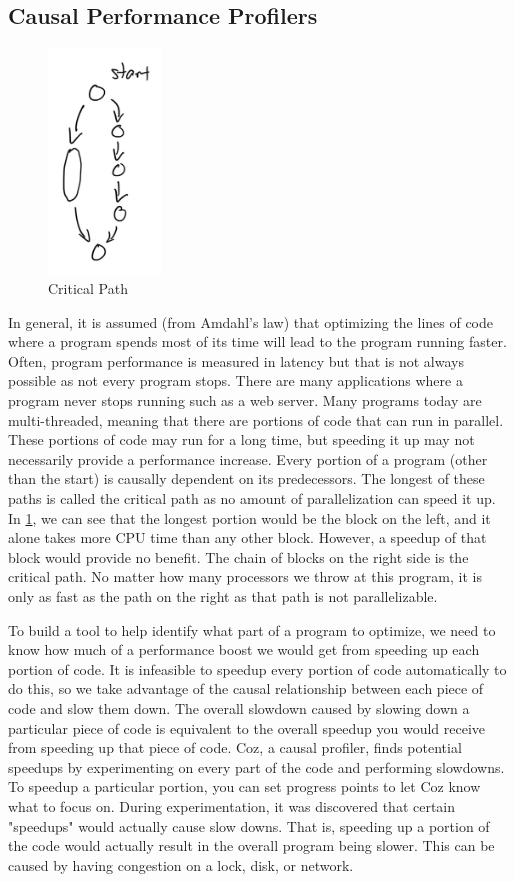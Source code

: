 \documentclass[10pt]{article}
\begin{document}
\subsection{Causal Performance Profilers}
\begin{figure}[H]
\centering
\includegraphics[width=3cm]{critical_path.jpeg}
\caption{Critical Path}
\label{fig:1}
\end{figure}
In general, it is assumed (from Amdahl's law) that optimizing the lines of code where a program spends most of its time will lead to the program running faster. 
Often, program performance is measured in latency but that is not always possible as not every program stops.
There are many applications where a program never stops running such as a web server.
Many programs today are multi-threaded, meaning that there are portions of code that can run in parallel. 
These portions of code may run for a long time, but speeding it up may not necessarily provide a performance increase. 
Every portion of a program (other than the start) is causally dependent on its predecessors.
The longest of these paths is called the critical path as no amount of parallelization can speed it up.
In \ref{fig:1}, we can see that the longest portion would be the block on the left, and it alone takes more CPU time than any other block.
However, a speedup of that block would provide no benefit. 
The chain of blocks on the right side is the critical path.
No matter how many processors we throw at this program, it is only as fast as the path on the right as that path is not parallelizable.

To build a tool to help identify what part of a program to optimize, we need to know how much of a performance boost we would get from speeding up each portion of code.
It is infeasible to speedup every portion of code automatically to do this, so we take advantage of the causal relationship between each piece of code and slow them down.
The overall slowdown caused by slowing down a particular piece of code is equivalent to the overall speedup you would receive from speeding up that piece of code. 
Coz, a causal profiler, finds potential speedups by experimenting on every part of the code and performing slowdowns. 
To speedup a particular portion, you can set progress points to let Coz know what to focus on. 
During experimentation, it was discovered that certain "speedups" would actually cause slow downs. 
That is, speeding up a portion of the code would actually result in the overall program being slower.
This can be caused by having congestion on a lock, disk, or network.
\end{document}
